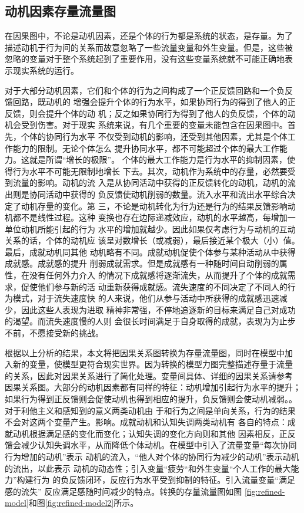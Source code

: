 \subsection{动机因素存量流量图}

在因果图中，不论是动机因素，还是个体的行为都是系统的状态，是存量。为了
描述动机于行为间的关系而故意忽略了一些流量变量和外生变量。但是，这些被
忽略的变量对于整个系统起到了重要作用，没有这些变量系统就不可能正确地表
示现实系统的运行。

对于大部分动机因素，它们和个体的行为之间构成了一个正反馈回路和一个负反
馈回路，既动机的
增强会提升个体的行为水平，如果协同行为的得到了他人的正反馈，则会提升个体的动
机；反之如果协同行为得到了他人的负反馈，个体的动机会受到伤害。对于现实
系统来说，有几个重要的变量未能包含在因果图中。首先，个体的协同行为水平
不仅受到动机的影响，还受到其他因素，尤其是个体工作能力的限制。无论个体怎么
提升协同水平，都不可能超过个体的最大工作能力。这就是所谓“增长的极限”。
个体的最大工作能力是行为水平的抑制因素，使得行为水平不可能无限制地增长
下去。其次，动机作为系统中的存量，必然要受到流量的影响。动机的流
入是从协同活动中获得的正反馈转化的动机，动机的流出则是协同活动中获得的
负反馈使动机削弱的数量。流入水平和流出水平综合决定了动机存量的变化。第
三，不论是动机转化为行为还是行为的结果反馈影响动机都不是线性过程。这种
变换也存在边际递减效应，动机的水平越高，每增加一单位动机所能引起的行为
水平的增加就越少。因此如果仅考虑行为与动机的互动关系的话，个体的动机应
该呈对数增长（或减弱），最后接近某个极大（小）值。最后，成就动机同其他
动机略有不同。成就动机促使个体参与某种活动从中获得成就感。成就感的提升
削弱成就需求。但是成就感有一种随时间自动削弱的属性，在没有任何外力介入
的情况下成就感将逐渐流失，从而提升了个体的成就需求，促使他们参与新的活
动重新获得成就感。流失速度的不同决定了不同人的行为模式，对于流失速度快
的人来说，他们从参与活动中所获得的成就感迅速减少，因此这些人表现为进取
精神非常强，不停地追逐新的目标来满足自己对成功的渴望。而流失速度慢的人则
会很长时间满足于自身取得的成就，表现为为止步不前，不愿接受新的挑战。

根据以上分析的结果，本文将把因果关系图转换为存量流量图，同时在模型中加
入新的变量，使模型更符合现实世界。因为转换的模型力图完整描述存量于流量
的关系，因此对因果关系进行了简化处理。变量间具体、详细的因果关系请参考
因果关系图。大部分的动机因素都有同样的特征：动机增加引起行为水平的提升；
如果行为得到正反馈则会促使动机也得到相应的提升，负反馈则会使动机减弱。。对于利他主义和感知到的意义两类动机由
于和行为之间是单向关系，行为的结果不会对这两个变量产生。影响。成就动机和认知失调两类动机有
各自的特点：成就动机根据满足感的变化而变化；认知失调的变化方向则和其他
因素相反，正反馈会减少认知失调水平，从而降低个体动机。在模型中引入了流量变量“每次协同行为增加的动机”表示
动机的流入，“他人对个体的协同行为减少的动机”表示动机的流出，以此表示
动机的动态性；引入变量“疲劳“和外生变量“个人工作的最大能力”构建行为
的负反馈闭环，反应行为水平受到抑制的特征。引入流量变量“满足感的流失”
反应满足感随时间减少的特点。转换的存量流量图如图
\ref{fig:refined-model}和图\ref{fig:refined-model2}所示。

